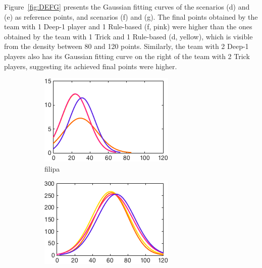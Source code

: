 Figure~\ref{fig:DEFG} presents the Gaussian fitting curves of the scenarios (d) and (e) as reference points, and scenarios (f) and (g).
The final points obtained by the team with 1 Deep-1 player and 1 Rule-based (f, pink) were higher than the ones obtained by the team with 1 Trick and 1 Rule-based (d, yellow), which is visible from the density between 80 and 120 points.
Similarly, the team with 2 Deep-1 players also has its Gaussian fitting curve on the right of the team with 2 Trick players, suggesting its achieved final points were higher.

\begin{figure}[h]
        \centering
        \begin{subfigure}[h]{0.32\textwidth}
                \includegraphics[width=\textwidth]{./img/5/DEFGhard}
                \caption{filipa}
                \label{fig:DEFGhard}
        \end{subfigure}
        \begin{subfigure}[h]{0.32\textwidth}
                \includegraphics[width=\textwidth]{./img/5/DEFGmedium}

\end{subfigure}
\end{figure}
